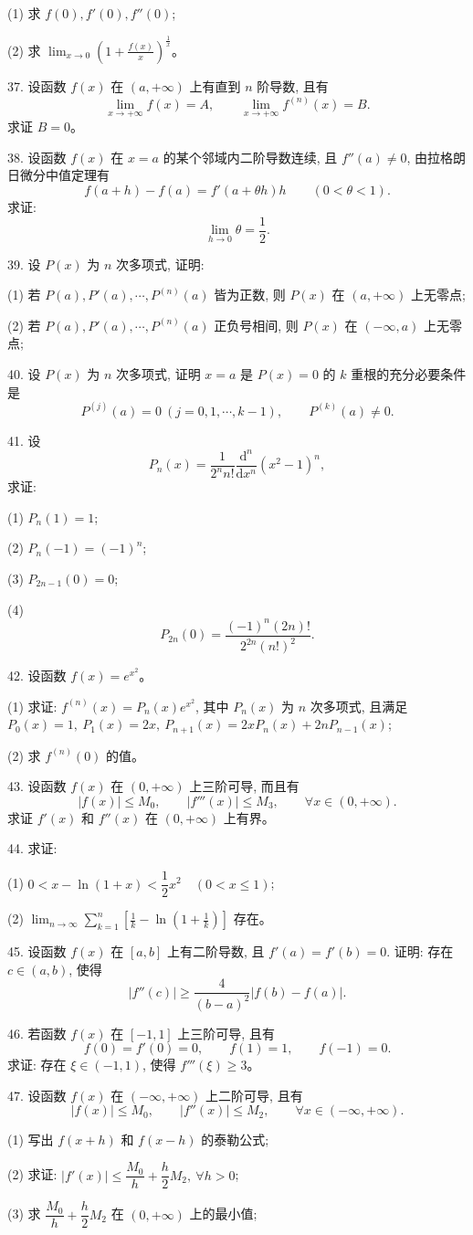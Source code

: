 \documentclass[UTF8, 12pt, fontset=fandol, oneside]{ctexart}
\begin{document}
(1) 求 $f(0),f'(0),f''(0)$;

(2) 求 $\displaystyle\lim_{x\to0}\left(1+\frac{f(x)}x\right)^{\frac1x}$。

37. 设函数 $f(x)$ 在 $(a,+\infty)$ 上有直到 $n$ 阶导数, 且有
\[
  \lim_{x\to+\infty}f(x)=A,\qquad
  \lim_{x\to+\infty}f^{(n)}(x)=B.
\]
求证 $B=0$。

38. 设函数 $f(x)$ 在 $x=a$ 的某个邻域内二阶导数连续, 且 $f''(a)\ne0$, 由拉格朗日微分中值定理有
\[
  f(a+h)-f(a)=f'(a+\theta h)h\qquad (0<\theta<1).
\]
求证:
\[
  \lim_{h\to0}\theta=\frac12.
\]

39. 设 $P(x)$ 为 $n$ 次多项式, 证明:

(1) 若 $P(a),P'(a),\cdots,P^{(n)}(a)$ 皆为正数, 则 $P(x)$ 在 $(a,+\infty)$ 上无零点;

(2) 若 $P(a),P'(a),\cdots,P^{(n)}(a)$ 正负号相间, 则 $P(x)$ 在 $(-\infty,a)$ 上无零点;

40. 设 $P(x)$ 为 $n$ 次多项式, 证明 $x=a$ 是 $P(x)=0$ 的 $k$ 重根的充分必要条件是
\[
  P^{(j)}(a)=0\ (j=0,1,\cdots,k-1),\qquad P^{(k)}(a)\ne0.
\]

41. 设
\[
  P_n(x)=\frac1{2^n n!}\frac{\mathrm d^n}{\mathrm dx^n}(x^2-1)^n,
\]
求证:

(1) $P_n(1)=1$;

(2) $P_n(-1)=(-1)^n$;

(3) $P_{2n-1}(0)=0$;

(4)
\[
  P_{2n}(0)=\frac{(-1)^n(2n)!}{2^{2n}(n!)^2}.
\]

42. 设函数 $f(x)=e^{x^2}$。

(1) 求证: $f^{(n)}(x)=P_n(x)e^{x^2}$, 其中 $P_n(x)$ 为 $n$ 次多项式, 且满足 $P_0(x)=1,\ P_1(x)=2x,\ P_{n+1}(x)=2xP_n(x)+2nP_{n-1}(x)$;

(2) 求 $f^{(n)}(0)$ 的值。

43. 设函数 $f(x)$ 在 $(0,+\infty)$ 上三阶可导, 而且有
\[
  |f(x)|\leqslant M_0,\qquad |f'''(x)|\leqslant M_3,\qquad \forall x\in(0,+\infty).
\]
求证 $f'(x)$ 和 $f''(x)$ 在 $(0,+\infty)$ 上有界。

44. 求证:

(1) $0<x-\ln(1+x)<\dfrac12x^2\quad (0<x\leqslant1)$;

(2) $\displaystyle\lim_{n\to\infty}\sum_{k=1}^n\left[\frac1k-\ln\left(1+\frac1k\right)\right]$ 存在。

45. 设函数 $f(x)$ 在 $[a,b]$ 上有二阶导数, 且 $f'(a)=f'(b)=0$. 证明: 存在 $c\in(a,b)$, 使得
\[
  |f''(c)|\geqslant\frac4{(b-a)^2}|f(b)-f(a)|.
\]

46. 若函数 $f(x)$ 在 $[-1,1]$ 上三阶可导, 且有
\[
  f(0)=f'(0)=0,\qquad f(1)=1,\qquad f(-1)=0.
\]
求证: 存在 $\xi\in(-1,1)$, 使得 $f'''(\xi)\geqslant3$。

47. 设函数 $f(x)$ 在 $(-\infty,+\infty)$ 上二阶可导, 且有
\[
  |f(x)|\leqslant M_0,\qquad |f''(x)|\leqslant M_2,\qquad \forall x\in(-\infty,+\infty).
\]

(1) 写出 $f(x+h)$ 和 $f(x-h)$ 的泰勒公式;

(2) 求证: $|f'(x)|\leqslant\dfrac{M_0}h+\dfrac h2M_2,\ \forall h>0$;

(3) 求 $\dfrac{M_0}h+\dfrac h2M_2$ 在 $(0,+\infty)$ 上的最小值;
\end{document}
